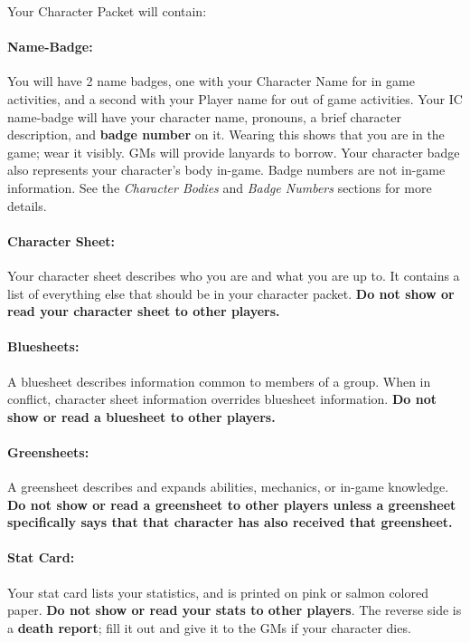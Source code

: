 \documentclass[sheet]{GL2020}
\begin{document}
Your Character Packet will contain:
\paragraph{Name-Badge:} You will have 2 name badges, one with your Character Name for in game activities, and a second with your Player name for out of game activities. Your IC name-badge will have your character name, pronouns, a brief character description, and {\bf badge number} on it. Wearing this shows that you are in the game; wear it visibly. GMs will provide lanyards to borrow. Your character badge also represents your character's body in-game. Badge numbers are not in-game information. See the \emph{Character Bodies} and \emph{Badge Numbers} sections for more details.

\paragraph{Character Sheet:} Your character sheet describes who you are and what you are up to. It contains a list of everything else that should be in your character packet. \textbf{Do not show or read your character sheet to other players.}

\paragraph{Bluesheets:} A bluesheet describes information common to members of a group. When in conflict, character sheet information overrides bluesheet information. \textbf{Do not show or read a bluesheet to other players.}

\paragraph{Greensheets:} A greensheet describes and expands abilities, mechanics, or in-game knowledge.\textbf{ Do not show or read a greensheet to other players unless a greensheet specifically says that that character has also received that greensheet.}

\paragraph{Stat Card:} Your stat card lists your statistics, and is printed on pink or salmon colored paper. \textbf{Do not show or read your stats to other players}. The reverse side is a {\bf death report}; fill it out and give it to the GMs if your character dies.
\end{document}
